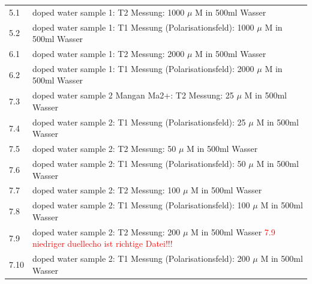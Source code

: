 \begin{tabular}{ll}
           5.1 & doped water sample 1: T2 Messung: 1000 $\mu$ M in 500ml Wasser \\
    
           5.2 & doped water sample 1: T1 Messung (Polarisationsfeld): 1000 $\mu$ M in 500ml Wasser \\

           6.1 & doped water sample 1: T2 Messung: 2000 $\mu$ M in 500ml Wasser \\
    
           6.2 & doped water sample 1: T1 Messung (Polarisationsfeld): 2000 $\mu$ M in 500ml Wasser \\

    

           7.3 & doped water sample 2 Mangan Ma2+: T2 Messung: 25 $\mu$ M in 500ml Wasser \\
    
           7.4 & doped water sample 2: T1 Messung (Polarisationsfeld): 25 $\mu$ M in 500ml Wasser \\
    
           7.5 & doped water sample 2: T2 Messung: 50 $\mu$ M in 500ml Wasser \\
    
           7.6 & doped water sample 2: T1 Messung (Polarisationsfeld): 50 $\mu$ M in 500ml Wasser \\

           7.7 & doped water sample 2: T2 Messung: 100 $\mu$ M in 500ml Wasser \\
    
           7.8 & doped water sample 2: T1 Messung (Polarisationsfeld): 100 $\mu$ M in 500ml Wasser \\

           7.9 & doped water sample 2: T2 Messung: 200 $\mu$ M in 500ml Wasser \textcolor{red}{7.9 niedriger duellecho ist richtige Datei!!!} \\
    
           7.10 & doped water sample 2: T1 Messung (Polarisationsfeld): 200 $\mu$ M in 500ml Wasser \\

    
    \end{tabular}  
     
